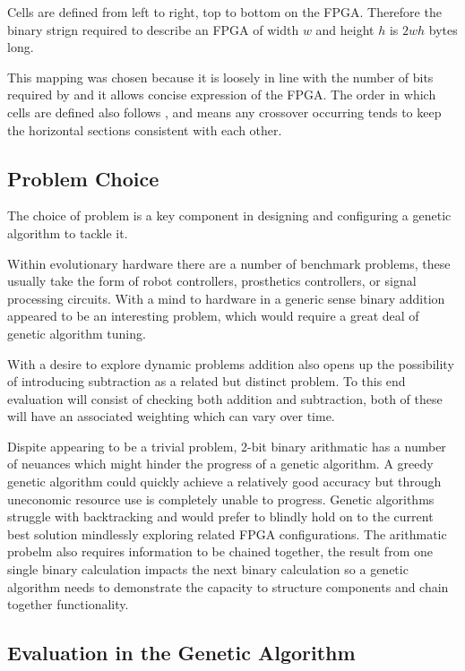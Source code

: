 Cells are defined from left to right, top to bottom on the FPGA. Therefore the
binary strign required to describe an FPGA of width $w$ and height $h$ is $2wh$
bytes long.

This mapping was chosen because it is loosely in line with the number of bits
required by \cite{10.1007/3-540-63173-9_61} and it allows concise expression of
the FPGA. The order in which cells are defined also follows
\cite{10.1007/3-540-63173-9_61}, and means any crossover occurring tends to keep
the horizontal sections consistent with each other.

\subsection{Problem Choice}

The choice of problem is a key component in designing and configuring a genetic
algorithm to tackle it.

Within evolutionary hardware there are a number of benchmark problems, these usually
take the form of robot controllers, prosthetics controllers, or signal processing
circuits. With a mind to hardware in a generic sense binary addition appeared to be
an interesting problem, which would require a great deal of genetic algorithm tuning.

With a desire to explore dynamic problems addition also opens up the possibility of
introducing subtraction as a related but distinct problem. To this end evaluation
will consist of checking both addition and subtraction, both of these will have an
associated weighting which can
vary over time.

Dispite appearing to be a trivial problem, 2-bit binary arithmatic has a number of
neuances which might hinder the progress of a genetic algorithm. A greedy genetic
algorithm could quickly achieve a relatively good accuracy but through uneconomic
resource use is completely unable to progress. Genetic algorithms struggle with backtracking
and would prefer to blindly hold on to the current best solution mindlessly exploring
related FPGA configurations. The arithmatic probelm also requires information to be
chained together, the result from one single binary calculation impacts the next binary
calculation so a genetic algorithm needs to demonstrate the capacity to structure
components and chain together functionality.

\subsection{Evaluation in the Genetic Algorithm}

